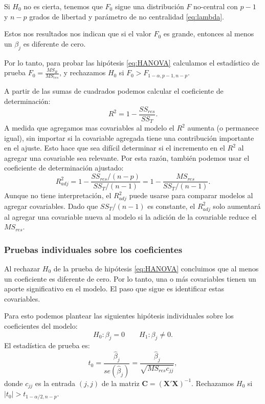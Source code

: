 \documentclass[
]{article}
\begin{document}
Si \(H_{0}\) no es cierta, tenemos que \(F_{0}\) sigue una distribución \(F\) no-central con \(p-1\) y \(n-p\) grados de libertad y parámetro de no centralidad \eqref{eq:lambda}.

Estos nos resultados nos indican que si el valor \(F_{0}\) es grande, entonces al menos un \(\beta_{j}\) es diferente de cero.

Por lo tanto, para probar las hipótesis \eqref{eq:HANOVA} calculamos el estadístico de prueba \(F_{0} = \frac{MS_{R}}{MS_{res}}\), y rechazamos \(H_{0}\) si \(F_{0} > F_{1-\alpha,p-1,n-p}\).

A partir de las sumas de cuadrados podemos calcular el coeficiente de determinación:
\[
R^{2} = 1-\frac{SS_{res}}{SS_{T}}.
\]
A medida que agregamos mas covariables al modelo el \(R^{2}\) aumenta (o permanece igual), sin importar si la covariable agregada tiene una contribución importante en el ajuste. Esto hace que sea difícil determinar si el incremento en el \(R^{2}\) al agregar una covariable sea relevante. Por esta razón, también podemos usar el coeficiente de determinación ajustado:
\[
R^{2}_{adj} = 1-\frac{SS_{res}/(n-p)}{SS_{T}/(n-1)} = 1 - \frac{MS_{res}}{SS_T/(n-1)}.
\]
Aunque no tiene interpretación, el \(R^{2}_{adj}\) puede usarse para comparar modelos al agregar covariables. Dado que \(SS_{T}/(n-1)\) es constante, el \(R^{2}_{adj}\) solo aumentará al agregar una covariable nueva al modelo si la adición de la covariable reduce el \(MS_{res}\).

\hypertarget{pruebas-individuales-sobre-los-coeficientes}{%
\subsubsection{Pruebas individuales sobre los coeficientes}\label{pruebas-individuales-sobre-los-coeficientes}}

Al rechazar \(H_{0}\) de la prueba de hipótesis \eqref{eq:HANOVA} concluimos que al menos un coeficiente es diferente de cero. Por lo tanto, una o más covariables tienen un aporte significativo en el modelo. El paso que sigue es identificar estas covariables.

Para esto podemos plantear las siguientes hipótesis individuales sobre los coeficientes del modelo:
\[
H_{0}: \beta_{j} = 0 \qquad H_{1}: \beta_{j} \neq 0.
\]
El estadística de prueba es:
\[
t_{0} = \frac{\widehat{\beta}_{j}}{se(\widehat{\beta}_{j})} = \frac{\widehat{\beta}_{j}}{\sqrt{MS_{res}c_{jj}}},
\]
donde \(c_{jj}\) es la entrada \((j,j)\) de la matriz \(\boldsymbol C= (\boldsymbol X'\boldsymbol X)^{-1}\). Rechazamos \(H_{0}\) si \(|t_{0}| > t_{1-\alpha/2,n-p}\).
\end{document}
